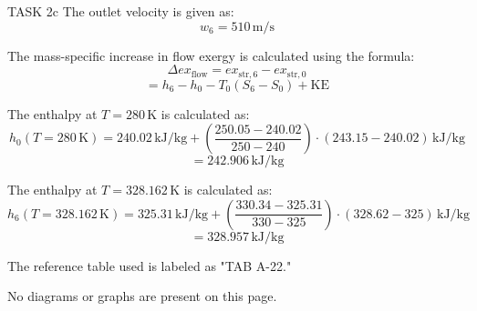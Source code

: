 TASK 2c  
The outlet velocity is given as:  
\[
w_6 = 510 \, \text{m/s}
\]

The mass-specific increase in flow exergy is calculated using the formula:  
\[
\Delta ex_{\text{flow}} = ex_{\text{str},6} - ex_{\text{str},0}
\]
\[
= h_6 - h_0 - T_0(S_6 - S_0) + \text{KE}
\]

The enthalpy at \( T = 280 \, \text{K} \) is calculated as:  
\[
h_0(T = 280 \, \text{K}) = 240.02 \, \text{kJ/kg} + \left( \frac{250.05 - 240.02}{250 - 240} \right) \cdot (243.15 - 240.02) \, \text{kJ/kg}
\]
\[
= 242.906 \, \text{kJ/kg}
\]

The enthalpy at \( T = 328.162 \, \text{K} \) is calculated as:  
\[
h_6(T = 328.162 \, \text{K}) = 325.31 \, \text{kJ/kg} + \left( \frac{330.34 - 325.31}{330 - 325} \right) \cdot (328.62 - 325) \, \text{kJ/kg}
\]
\[
= 328.957 \, \text{kJ/kg}
\]

The reference table used is labeled as "TAB A-22."  

No diagrams or graphs are present on this page.